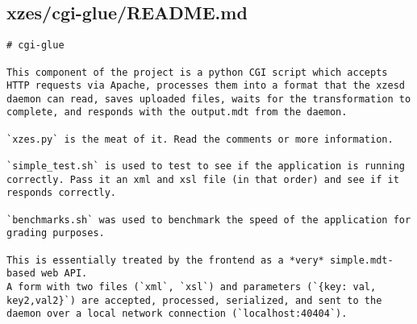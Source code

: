 \subsection{xzes/cgi-glue/README.md}
\begin{lstlisting}
# cgi-glue

This component of the project is a python CGI script which accepts HTTP requests via Apache, processes them into a format that the xzesd daemon can read, saves uploaded files, waits for the transformation to complete, and responds with the output.mdt from the daemon.

`xzes.py` is the meat of it. Read the comments or more information.

`simple_test.sh` is used to test to see if the application is running correctly. Pass it an xml and xsl file (in that order) and see if it responds correctly.

`benchmarks.sh` was used to benchmark the speed of the application for grading purposes.

This is essentially treated by the frontend as a *very* simple.mdt-based web API.
A form with two files (`xml`, `xsl`) and parameters (`{key: val, key2,val2}`) are accepted, processed, serialized, and sent to the daemon over a local network connection (`localhost:40404`).
\end{lstlisting}
